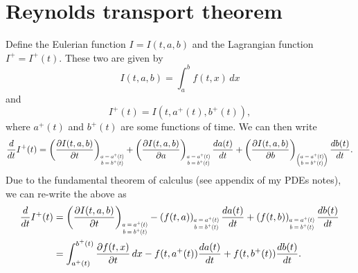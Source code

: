 \documentclass[oneside,a4paper,11pt]{report}
\begin{document}
\section{Reynolds transport theorem}
Define the Eulerian function $I = I(t,a,b)$ and the Lagrangian function $I^+ = I^+(t)$. These two are given by 
\begin{equation}
    I(t,a,b) = \int_a^b f(t,x) \, dx
\end{equation}
and 
\begin{equation}
    I^+(t) = I(t,a^+(t),b^+(t)),
\end{equation}
where $a^+(t)$ and $b^+(t)$ are some functions of time. We can then write
\begin{equation}
    \frac{d}{dt}I^+(t) = \left (\frac{\partial I(t,a,b)}{\partial t}\right)_{\scaleto{\begin{matrix} a=a^+(t) \\b=b^+(t) \end{matrix}}{15pt}} + \left (\frac{\partial I(t,a,b)}{\partial a}\right)_{\scaleto{\begin{matrix} a=a^+(t) \\b=b^+(t) \end{matrix}}{15pt}} \frac{d a(t)}{dt} + \left (\frac{\partial I(t,a,b)}{\partial b}\right)_{\scaleto{\begin{pmatrix} a=a^+(t) \\b=b^+(t) \end{pmatrix}}{15pt}} \frac{db(t)}{dt}.
\end{equation}
Due to the fundamental theorem of calculus (see appendix of my PDEs notes), we can re-write the above as
\begin{align}
    \frac{d}{dt}I^+(t) &= \left (\frac{\partial I(t,a,b)}{\partial t}\right)_{\scaleto{\begin{matrix} a=a^+(t) \\b=b^+(t) \end{matrix}}{15pt}} -\left ( f(t,a) \right)_{\scaleto{\begin{matrix} a=a^+(t) \\b=b^+(t) \end{matrix}}{15pt}}\frac{da(t)}{dt} + \left ( f(t,b) \right)_{\scaleto{\begin{matrix} a=a^+(t) \\b=b^+(t) \end{matrix}}{15pt}} \frac{db(t)}{dt} \nonumber \\
    &= \int_{a^+(t)}^{b^+(t)} \frac{\partial f(t,x)}{\partial t} \, dx - f(t,a^+(t)) \frac{da(t)}{dt} + f(t,b^+(t)) \frac{db(t)}{dt}.
\end{align}
\end{document}
